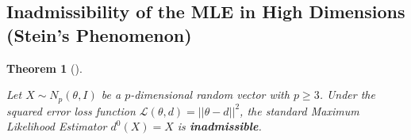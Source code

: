 \documentclass[
  letterpaper,
  DIV=11,
  numbers=noendperiod]{scrreprt}
\renewcommand{\[}{\begin{equation}}
\renewcommand{\]}{\end{equation}}
\theoremstyle{definition}
\theoremstyle{plain}
\theoremstyle{plain}
\theoremstyle{plain}
\newtheorem{theorem}{Theorem}[chapter]
\theoremstyle{definition}
\theoremstyle{plain}
\theoremstyle{remark}
\begin{document}
\subsection{Inadmissibility of the MLE in High Dimensions (Stein's
Phenomenon)}\label{inadmissibility-of-the-mle-in-high-dimensions-steins-phenomenon}

\begin{theorem}[]\protect\hypertarget{thm-mle-inadmissible}{}\label{thm-mle-inadmissible}

Let \(X \sim N_p(\theta, I)\) be a \(p\)-dimensional random vector with
\(p \ge 3\). Under the squared error loss function
\(\mathcal{L}(\theta, d) = ||\theta - d||^2\), the standard Maximum
Likelihood Estimator \(d^0(X) = X\) is \textbf{inadmissible}.

\end{theorem}
\end{document}
